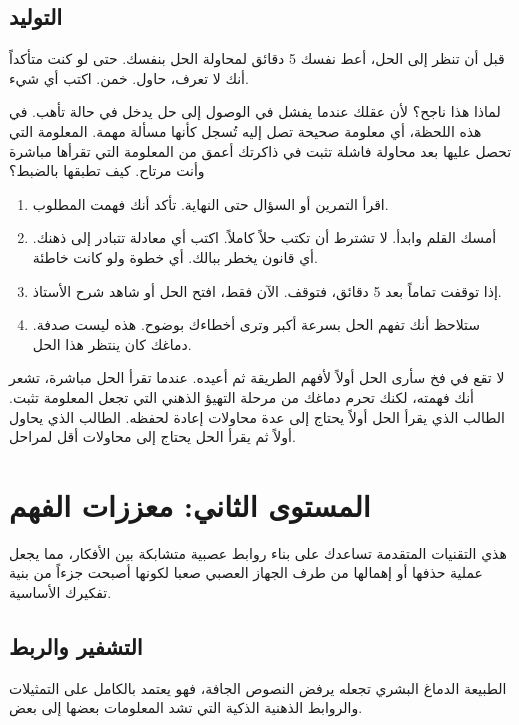\documentclass[12pt,a4paper]{book}
\begin{document}
\subsection{التوليد}

قبل أن تنظر إلى الحل، أعط نفسك 5 دقائق لمحاولة الحل بنفسك. حتى لو كنت متأكداً أنك لا تعرف، حاول. خمن. اكتب أي شيء.

لماذا هذا ناجح؟ لأن عقلك عندما يفشل في الوصول إلى حل يدخل في حالة تأهب. في هذه اللحظة، أي معلومة صحيحة تصل إليه تُسجل كأنها مسألة مهمة. المعلومة التي تحصل عليها بعد محاولة فاشلة تثبت في ذاكرتك أعمق من المعلومة التي تقرأها مباشرة وأنت مرتاح. كيف تطبقها بالضبط؟

\begin{enumerate}
	\item اقرأ التمرين أو السؤال حتى النهاية. تأكد أنك فهمت المطلوب.
	\item أمسك القلم وابدأ. لا تشترط أن تكتب حلاً كاملاً. اكتب أي معادلة تتبادر إلى ذهنك. أي قانون يخطر ببالك. أي خطوة ولو كانت خاطئة.
	\item إذا توقفت تماماً بعد 5 دقائق، فتوقف. الآن فقط، افتح الحل أو شاهد شرح الأستاذ.
	\item ستلاحظ أنك تفهم الحل بسرعة أكبر وترى أخطاءك بوضوح. هذه ليست صدفة. دماغك كان ينتظر هذا الحل.
\end{enumerate}

لا تقع في فخ سأرى الحل أولاً لأفهم الطريقة ثم أعيده. عندما تقرأ الحل مباشرة، تشعر أنك فهمته، لكنك تحرم دماغك من مرحلة التهيؤ الذهني التي تجعل المعلومة تثبت. الطالب الذي يقرأ الحل أولاً يحتاج إلى عدة محاولات إعادة لحفظه. الطالب الذي يحاول أولاً ثم يقرأ الحل يحتاج إلى محاولات أقل لمراحل.
	
	\section{المستوى الثاني: معززات الفهم}
	
	هذي التقنيات المتقدمة تساعدك على بناء روابط عصبية متشابكة بين الأفكار، مما يجعل عملية حذفها أو إهمالها من طرف الجهاز العصبي صعبا لكونها أصبحت جزءاً من بنية تفكيرك الأساسية.
	
	\subsection{التشفير والربط}
	
	الطبيعة الدماغ البشري تجعله يرفض النصوص الجافة، فهو يعتمد بالكامل على التمثيلات والروابط الذهنية الذكية التي تشد المعلومات بعضها إلى بعض.
	
\end{document}
